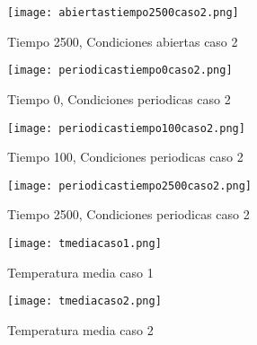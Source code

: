 \documentclass{article}
\begin{document}
\begin{figure}
 \centering
\texttt{[image: abiertastiempo2500caso2.png]}
 \caption{ Tiempo 2500, Condiciones abiertas caso 2}
 \end{figure}


\begin{figure}
 \centering
\texttt{[image: periodicastiempo0caso2.png]}
 \caption{ Tiempo 0, Condiciones periodicas caso 2}
 \end{figure}

\begin{figure}
 \centering
\texttt{[image: periodicastiempo100caso2.png]}
 \caption{ Tiempo 100, Condiciones periodicas caso 2}
 \end{figure}

\begin{figure}
 \centering
\texttt{[image: periodicastiempo2500caso2.png]}
 \caption{ Tiempo 2500, Condiciones periodicas caso 2}
 \end{figure}

\begin{figure}
 \centering
\texttt{[image: tmediacaso1.png]}
 \caption{ Temperatura media caso 1}
 \end{figure}
\begin{figure}
 \centering
\texttt{[image: tmediacaso2.png]}
 \caption{ Temperatura media caso 2}
 \end{figure}
\end{document}
